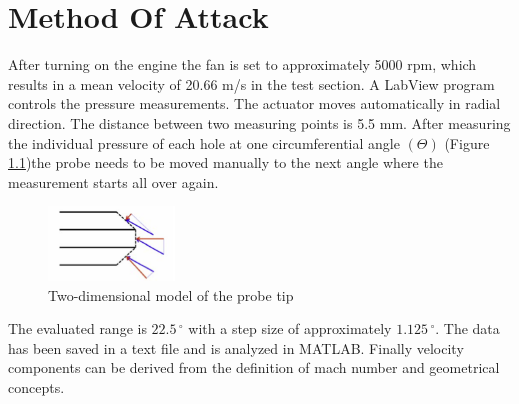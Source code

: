
\chapter{Method Of Attack}\label{sec:methodofattack}

After turning on the engine the fan is set to approximately 5000 rpm, which results in a mean velocity of 20.66 m/s in the test section. A LabView program controls the pressure measurements. The actuator moves automatically in radial direction. The distance between two measuring points is 5.5 mm. After measuring the individual pressure of each hole at one circumferential angle $(\Theta)$ (Figure \ref{fig:f4})the probe needs to be moved manually to the next angle where the measurement starts all over again.

\begin{figure}[H]
\centering
\includegraphics[width=0.3\textwidth]{pics/f4.png}
\caption{Two-dimensional model of the probe tip}
\label{fig:f4}
\end{figure}

 The evaluated range is $22.5\,^{\circ}$ with a step size of approximately $1.125\,^{\circ}$. The data has been saved in a text file and is analyzed in MATLAB. Finally velocity components can be derived from the definition of mach number and geometrical concepts.

